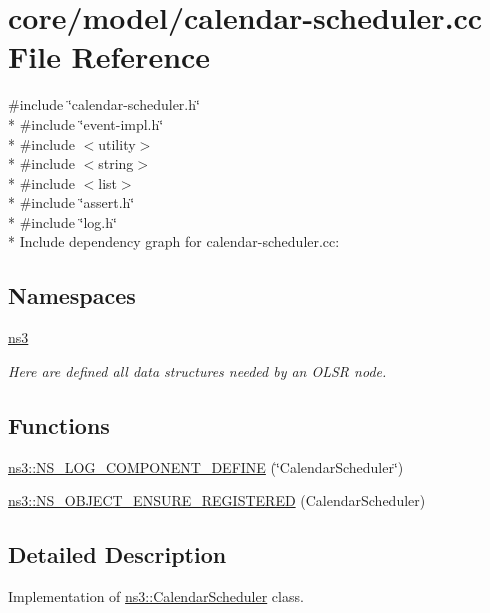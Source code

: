 \hypertarget{calendar-scheduler_8cc}{}\section{core/model/calendar-\/scheduler.cc File Reference}
\label{calendar-scheduler_8cc}
{\ttfamily \#include \char`\"{}calendar-\/scheduler.\+h\char`\"{}}\\*
{\ttfamily \#include \char`\"{}event-\/impl.\+h\char`\"{}}\\*
{\ttfamily \#include $<$utility$>$}\\*
{\ttfamily \#include $<$string$>$}\\*
{\ttfamily \#include $<$list$>$}\\*
{\ttfamily \#include \char`\"{}assert.\+h\char`\"{}}\\*
{\ttfamily \#include \char`\"{}log.\+h\char`\"{}}\\*
Include dependency graph for calendar-\/scheduler.cc\+:
\subsection*{Namespaces}
\begin{DoxyCompactItemize}
\item 
 \hyperlink{namespacens3}{ns3}
\begin{DoxyCompactList}\small\item\em Here are defined all data structures needed by an O\+L\+SR node. \end{DoxyCompactList}\end{DoxyCompactItemize}
\subsection*{Functions}
\begin{DoxyCompactItemize}
\item 
\hyperlink{namespacens3_a85f4f2b030f887821c1c1be19866c0ea}{ns3\+::\+N\+S\+\_\+\+L\+O\+G\+\_\+\+C\+O\+M\+P\+O\+N\+E\+N\+T\+\_\+\+D\+E\+F\+I\+NE} (\char`\"{}Calendar\+Scheduler\char`\"{})
\item 
\hyperlink{namespacens3_a2aab15802abdf0c2a29dbb96c967c98e}{ns3\+::\+N\+S\+\_\+\+O\+B\+J\+E\+C\+T\+\_\+\+E\+N\+S\+U\+R\+E\+\_\+\+R\+E\+G\+I\+S\+T\+E\+R\+ED} (Calendar\+Scheduler)
\end{DoxyCompactItemize}


\subsection{Detailed Description}
Implementation of \hyperlink{classns3_1_1CalendarScheduler}{ns3\+::\+Calendar\+Scheduler} class. 
